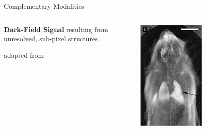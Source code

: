\documentclass[
 ]{beamer}%
\begin{document}
\begin{frame}{Complementary Modalities}
    \vspace{0.2cm}
    \begin{columns}
        \begin{column}{.62\textwidth} 
            \textbf{Dark-Field Signal} resulting from unresolved, sub-pixel structures 
            
            \vspace{0.5cm}
            \darkfieldscatter

            \vspace{0.8cm}
            \scriptsize adapted from \cite{c93883346cc94c57814d1d935575b678}
        \end{column}

        \begin{column}{.28\textwidth}
            \begin{figure}[ht]
                \centering
                \includegraphics[width=0.7\textwidth]{images/XRay_DarkField_Contrast.jpg}
                
                \scriptsize\cite{Bech2013}
                \label{fig:darkfield_contrast}
            \end{figure}
        \end{column}
    \end{columns}
\end{frame}
\end{document}
